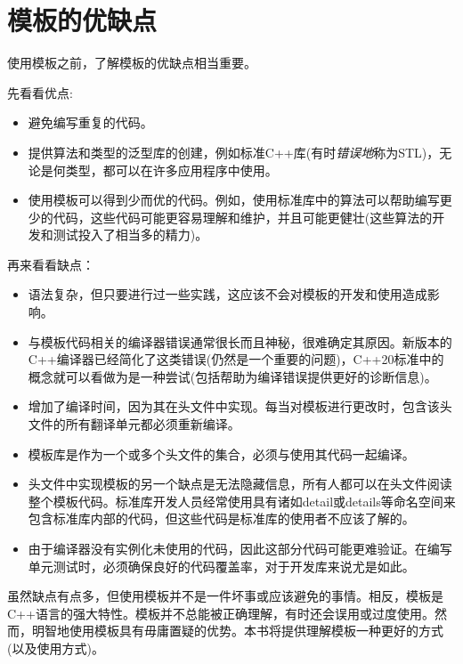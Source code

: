 \section{模板的优缺点}

使用模板之前，了解模板的优缺点相当重要。

先看看优点:

\begin{itemize}
\item
避免编写重复的代码。

\item
提供算法和类型的泛型库的创建，例如标准C++库(有时\textit{错误地}称为STL)，无论是何类型，都可以在许多应用程序中使用。

\item
使用模板可以得到少而优的代码。例如，使用标准库中的算法可以帮助编写更少的代码，这些代码可能更容易理解和维护，并且可能更健壮(这些算法的开发和测试投入了相当多的精力)。
\end{itemize}

再来看看缺点：

\begin{itemize}
\item
语法复杂，但只要进行过一些实践，这应该不会对模板的开发和使用造成影响。

\item
与模板代码相关的编译器错误通常很长而且神秘，很难确定其原因。新版本的C++编译器已经简化了这类错误(仍然是一个重要的问题)，C++20标准中的概念就可以看做为是一种尝试(包括帮助为编译错误提供更好的诊断信息)。

\item
增加了编译时间，因为其在头文件中实现。每当对模板进行更改时，包含该头文件的所有翻译单元都必须重新编译。

\item
模板库是作为一个或多个头文件的集合，必须与使用其代码一起编译。

\item
头文件中实现模板的另一个缺点是无法隐藏信息，所有人都可以在头文件阅读整个模板代码。标准库开发人员经常使用具有诸如detail或details等命名空间来包含标准库内部的代码，但这些代码是标准库的使用者不应该了解的。

\item
由于编译器没有实例化未使用的代码，因此这部分代码可能更难验证。在编写单元测试时，必须确保良好的代码覆盖率，对于开发库来说尤是如此。
\end{itemize}

虽然缺点有点多，但使用模板并不是一件坏事或应该避免的事情。相反，模板是C++语言的强大特性。模板并不总能被正确理解，有时还会误用或过度使用。然而，明智地使用模板具有毋庸置疑的优势。本书将提供理解模板一种更好的方式(以及使用方式)。








